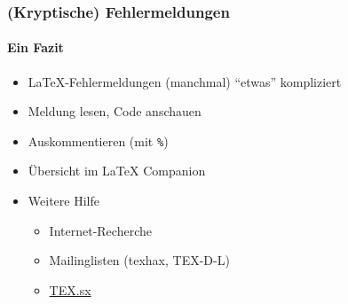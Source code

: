 \begin{frame}
  \frametitle{(Kryptische) Fehlermeldungen}
  \framesubtitle{Ein Fazit}
  \begin{itemize}
  \item \LaTeX-Fehlermeldungen (manchmal) \enquote{etwas}
      kompliziert
  \item Meldung lesen, Code anschauen
  \item Auskommentieren (mit \texttt{\%})
  \item Übersicht im \LaTeX{} Companion
  \item Weitere Hilfe
    \begin{itemize}
    \item Internet-Recherche
    \item Mailinglisten (texhax, TEX-D-L)
    \item \href{http://tex.stackexchange.com}{TEX.sx}
    \end{itemize}
  \end{itemize}
\end{frame}

